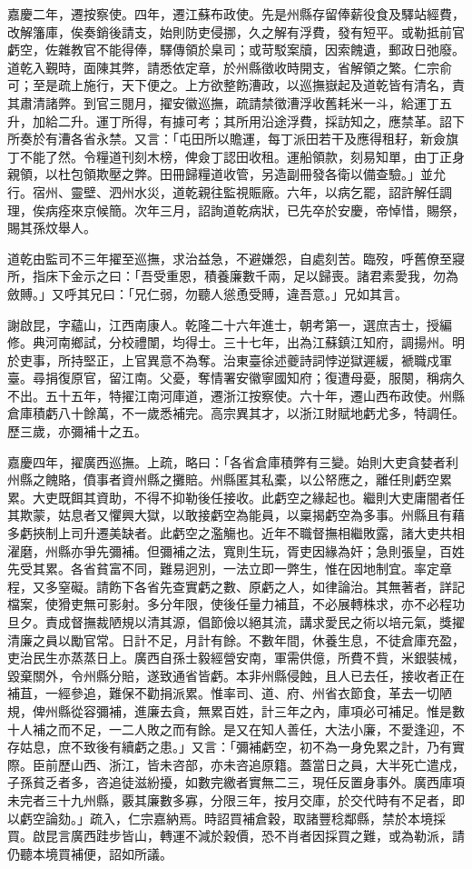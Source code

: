 \begin{pinyinscope}
嘉慶二年，遷按察使。四年，遷江蘇布政使。先是州縣存留俸薪役食及驛站經費，改解籓庫，俟奏銷後請支，始則防吏侵挪，久之解有浮費，發有短平。或勒抵前官虧空，佐雜教官不能得俸，驛傳領於臬司；或苛駁案牘，因索餽遺，郵政日弛廢。道乾入覲時，面陳其弊，請悉依定章，於州縣徵收時開支，省解領之繁。仁宗俞可；至是疏上施行，天下便之。上方欲整飭漕政，以巡撫嶽起及道乾皆有清名，責其肅清諸弊。到官三閱月，擢安徽巡撫，疏請禁徵漕浮收舊耗米一斗，給運丁五升，加給二升。運丁所得，有據可考；其所用沿途浮費，採訪知之，應禁革。詔下所奏於有漕各省永禁。又言：「屯田所以贍運，每丁派田若干及應得租耔，新僉旗丁不能了然。令糧道刊刻木榜，俾僉丁認田收租。運船領款，刻易知單，由丁正身親領，以杜包領欺壓之弊。田冊歸糧道收管，另造副冊發各衛以備查驗。」並允行。宿州、靈壁、泗州水災，道乾親往監視賑廠。六年，以病乞罷，詔許解任調理，俟病痊來京候簡。次年三月，詔詢道乾病狀，已先卒於安慶，帝悼惜，賜祭，賜其孫炆舉人。

道乾由監司不三年擢至巡撫，求治益急，不避嫌怨，自處刻苦。臨歿，呼舊僚至寢所，指床下金示之曰：「吾受重恩，積養廉數千兩，足以歸喪。諸君素愛我，勿為斂賻。」又呼其兄曰：「兄仁弱，勿聽人慫恿受賻，違吾意。」兄如其言。

謝啟昆，字蘊山，江西南康人。乾隆二十六年進士，朝考第一，選庶吉士，授編修。典河南鄉試，分校禮闈，均得士。三十七年，出為江蘇鎮江知府，調揚州。明於吏事，所持堅正，上官異意不為奪。治東臺徐述夔詩詞悖逆獄遲緩，褫職戍軍臺。尋捐復原官，留江南。父憂，奪情署安徽寧國知府；復遭母憂，服闋，稱病久不出。五十五年，特擢江南河庫道，遷浙江按察使。六十年，遷山西布政使。州縣倉庫積虧八十餘萬，不一歲悉補完。高宗異其才，以浙江財賦地虧尤多，特調任。歷三歲，亦彌補十之五。

嘉慶四年，擢廣西巡撫。上疏，略曰：「各省倉庫積弊有三變。始則大吏貪婪者利州縣之餽賂，僨事者資州縣之攤賠。州縣匿其私橐，以公帑應之，離任則虧空累累。大吏既餌其資助，不得不抑勒後任接收。此虧空之緣起也。繼則大吏庸闇者任其欺蒙，姑息者又懼興大獄，以敢接虧空為能員，以稟揭虧空為多事。州縣且有藉多虧挾制上司升遷美缺者。此虧空之濫觴也。近年不職督撫相繼敗露，諸大吏共相濯磨，州縣亦爭先彌補。但彌補之法，寬則生玩，胥吏因緣為奸；急則張皇，百姓先受其累。各省貧富不同，難易迥別，一法立即一弊生，惟在因地制宜。率定章程，又多窒礙。請飭下各省先查實虧之數、原虧之人，如律論治。其無著者，詳記檔案，使猾吏無可影射。多分年限，使後任量力補苴，不必展轉株求，亦不必程功旦夕。責成督撫裁陋規以清其源，倡節儉以絕其流，講求愛民之術以培元氣，獎擢清廉之員以勵官常。日計不足，月計有餘。不數年間，休養生息，不徒倉庫充盈，吏治民生亦蒸蒸日上。廣西自孫士毅經營安南，軍需供億，所費不貲，米銀裝械，毀棄關外，令州縣分賠，遂致通省皆虧。本非州縣侵蝕，且人已去任，接收者正在補苴，一經參追，難保不勸捐派累。惟率司、道、府、州省衣節食，革去一切陋規，俾州縣從容彌補，進廉去貪，無累百姓，計三年之內，庫項必可補足。惟是數十人補之而不足，一二人敗之而有餘。是又在知人善任，大法小廉，不愛逢迎，不存姑息，庶不致後有續虧之患。」又言：「彌補虧空，初不為一身免累之計，乃有實際。臣前歷山西、浙江，皆未咨部，亦未咨追原籍。蓋當日之員，大半死亡遣戍，子孫貧乏者多，咨追徒滋紛擾，如數完繳者實無二三，現任反置身事外。廣西庫項未完者三十九州縣，覈其廉數多寡，分限三年，按月交庫，於交代時有不足者，即以虧空論劾。」疏入，仁宗嘉納焉。時詔買補倉穀，取諸豐稔鄰縣，禁於本境採買。啟昆言廣西跬步皆山，轉運不減於穀價，恐不肖者因採買之難，或為勒派，請仍聽本境買補便，詔如所議。


\end{pinyinscope}
